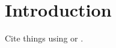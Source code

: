 \section{Introduction}

Cite things using \citet{tikhonov1977} or \citep{tikhonov1977}.

\lipsum[2]
